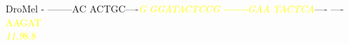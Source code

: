 \documentclass[11pt,twoside,reqno,a4paper]{article}
\begin{document}
{\hspace*{7\charwidth}\hspace*{1\charwidth}\hspace*{1\charwidth}\hspace*{1\charwidth}\hspace*{1\charwidth}\hspace*{1\charwidth}\hspace*{1\charwidth}\\
\\
DroMel	-	--------AC	ACTGC----\textit{\textcolor{Yellow}{G}}	\textit{\textcolor{Yellow}{G}}\textit{\textcolor{Yellow}{G}}\textit{\textcolor{Yellow}{A}}\textit{\textcolor{Yellow}{T}}\textit{\textcolor{Yellow}{A}}\textit{\textcolor{Yellow}{C}}\textit{\textcolor{Yellow}{T}}\textit{\textcolor{Yellow}{C}}\textit{\textcolor{Yellow}{C}}\textit{\textcolor{Yellow}{G}}	\textit{\textcolor{Yellow}{-}}\textit{\textcolor{Yellow}{-}}\textit{\textcolor{Yellow}{-}}\textit{\textcolor{Yellow}{-}}\textit{\textcolor{Yellow}{-}}\textit{\textcolor{Yellow}{-}}\textit{\textcolor{Yellow}{-}}\textit{\textcolor{Yellow}{G}}\textit{\textcolor{Yellow}{A}}\textit{\textcolor{Yellow}{A}}	\textit{\textcolor{Yellow}{T}}\textit{\textcolor{Yellow}{A}}\textit{\textcolor{Yellow}{C}}\textit{\textcolor{Yellow}{T}}\textit{\textcolor{Yellow}{C}}\textit{\textcolor{Yellow}{A}}----	----\textcolor{Yellow}{A}\textcolor{Yellow}{A}\textcolor{Yellow}{G}\textcolor{Yellow}{A}\textcolor{Yellow}{T}\\
\hspace*{7\charwidth}\hspace*{1\charwidth}\hspace*{1\charwidth}\hspace*{20\charwidth}\textit{\textcolor{Yellow}{11.9}}\hspace*{1\charwidth}\hspace*{1\charwidth}\hspace*{1\charwidth}\hspace*{1\charwidth}\hspace*{31\charwidth}\textcolor{Yellow}{8.8}\\
}
\end{document}
